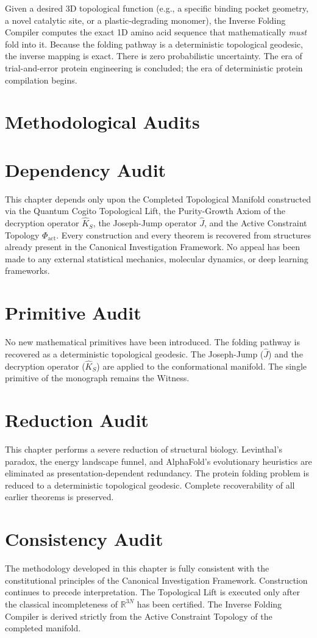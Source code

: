 \documentclass[11pt,openany]{extbook}
\newenvironment{dependencyaudit}{\section*{Dependency Audit}}{}
\newenvironment{primitiveaudit}{\section*{Primitive Audit}}{}
\newenvironment{reductionaudit}{\section*{Reduction Audit}}{}
\newenvironment{consistencyaudit}{\section*{Consistency Audit}}{}
\theoremstyle{plain}
\theoremstyle{definition}
\begin{document}
Given a desired 3D topological function (e.g., a specific binding pocket geometry, a novel catalytic site, or a plastic-degrading monomer), the Inverse Folding Compiler computes the exact 1D amino acid sequence that mathematically \textit{must} fold into it. Because the folding pathway is a deterministic topological geodesic, the inverse mapping is exact. There is zero probabilistic uncertainty. The era of trial-and-error protein engineering is concluded; the era of deterministic protein compilation begins.

\section{Methodological Audits}

\begin{dependencyaudit}
\noindent This chapter depends only upon the Completed Topological Manifold constructed via the Quantum Cogito Topological Lift, the Purity-Growth Axiom of the decryption operator $\hat{K}_S$, the Joseph-Jump operator $\hat{J}$, and the Active Constraint Topology $\Phi_{\mathrm{act}}$. Every construction and every theorem is recovered from structures already present in the Canonical Investigation Framework. No appeal has been made to any external statistical mechanics, molecular dynamics, or deep learning frameworks.
\end{dependencyaudit}

\begin{primitiveaudit}
\noindent No new mathematical primitives have been introduced. The folding pathway is recovered as a deterministic topological geodesic. The Joseph-Jump ($\hat{J}$) and the decryption operator ($\hat{K}_S$) are applied to the conformational manifold. The single primitive of the monograph remains the Witness.
\end{primitiveaudit}

\begin{reductionaudit}
\noindent This chapter performs a severe reduction of structural biology. Levinthal's paradox, the energy landscape funnel, and AlphaFold's evolutionary heuristics are eliminated as presentation-dependent redundancy. The protein folding problem is reduced to a deterministic topological geodesic. Complete recoverability of all earlier theorems is preserved.
\end{reductionaudit}

\begin{consistencyaudit}
\noindent The methodology developed in this chapter is fully consistent with the constitutional principles of the Canonical Investigation Framework. Construction continues to precede interpretation. The Topological Lift is executed only after the classical incompleteness of $\mathbb{R}^{3N}$ has been certified. The Inverse Folding Compiler is derived strictly from the Active Constraint Topology of the completed manifold.
\end{consistencyaudit}
\end{document}
